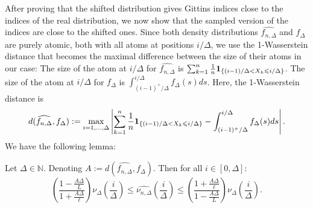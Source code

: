 \documentclass[11pt]{article}
\newcommand{\red}[1]{{\color{red}#1}}
\renewcommand{\leq}{\leqslant}
\newcommand{\N}{\mathbb{N}}
\begin{document}
After proving that the shifted distribution gives Gittins indices close to the indices of the
real distribution, we now show that the sampled version of the  indices are close to
the shifted ones. Since both density distributions $ \widehat{f_{n, \Delta}}$ and $f_\Delta$ are purely atomic, both with all atoms at positions $i/\Delta$, we use the 1-Wasserstein distance that becomes the maximal difference between the size of their atoms in our case:
The size of the atom at $i/\Delta$ for  $ \widehat{f_{n, \Delta}}$ is $\sum_{k=1}^n \frac{1}{n}{\bf 1}_{\{(i-1)/\Delta < X_k \leq i/\Delta\}}$. The size of the atom at $i/\Delta$ for  $f_{\Delta}$ is $\int_{(i-1)^+/\Delta}^{i/\Delta} f_\Delta(s) ds$.
Here, the 1-Wasserstein distance is
\[ d(\widehat{f_{n, \Delta}}, f_\Delta)  := \max_{i=1,...,\Delta} \left\vert \sum_{k=1}^n \frac{1}{n} {\bf 1}_{\{(i-1)/\Delta < X_k \leq i/\Delta\}} - \int_{(i-1)^+/\Delta}^{i/\Delta} f_\Delta(s) ds \right\vert.\]
We have the following lemma:

\begin{lemma}\label{lem:sample}
    Let $\Delta \in \N$. Denoting $A := d(\widehat{f_{n, \Delta}}, f_\Delta)$. Then for all $i \in [0, \Delta]$:
    \begin{equation}\label{eq:sample}
        \left(\frac{1 - \frac{A\Delta}{L}}{1+\frac{A \Delta}{\ell}}\right) \nu_\Delta(\frac{i}{\Delta})
    \leq \widehat{\nu_{n, \Delta}}(\frac{i}{\Delta}) \leq \left(\frac{1 + \frac{A\Delta}{\ell}}{1 -
        \frac{A\Delta}{L}}\right) \nu_\Delta(\frac{i}{\Delta}).
  \end{equation}
\end{lemma}
\end{document}
